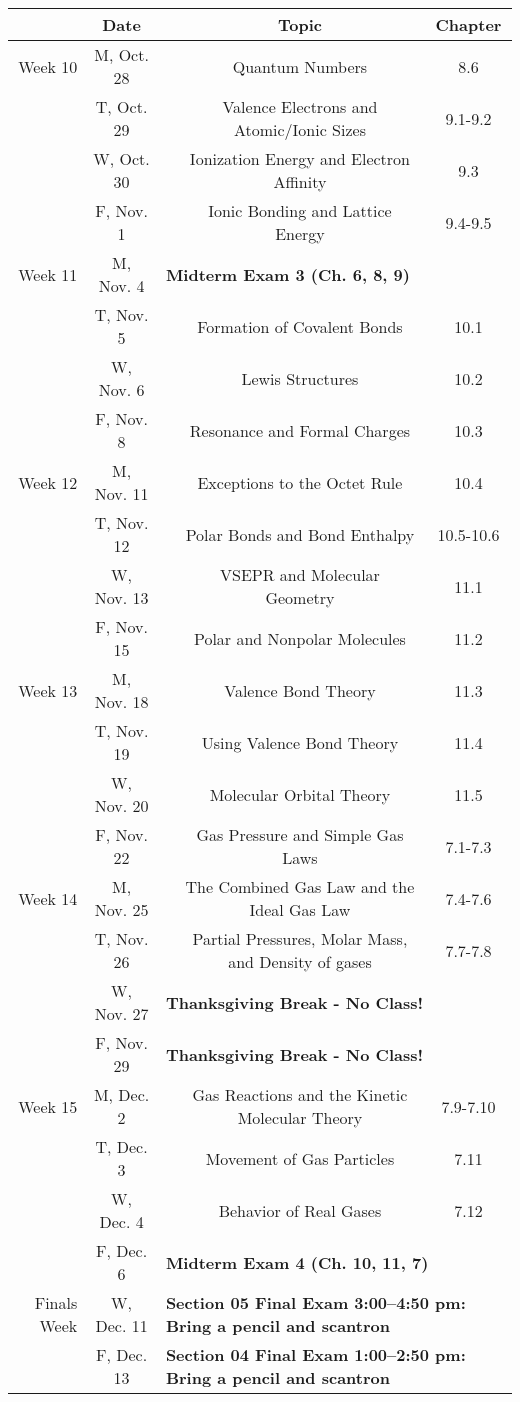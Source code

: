 \documentclass[12pt, letterpaper]{article}
\begin{document}
\noindent\hspace{-1.5em}
\begin{tabular}{rcccc}
	& Date && Topic & Chapter\\
	\midrule
	Week 10 & M, Oct. 28&& Quantum Numbers & 8.6\\
	& T, Oct. 29&& Valence Electrons and Atomic/Ionic Sizes & 9.1-9.2\\
	& W, Oct. 30&& Ionization Energy and Electron Affinity & 9.3\\
	& F, Nov. 1&& Ionic Bonding and Lattice Energy & 9.4-9.5\\
	\midrule
	Week 11 & M, Nov. 4& \multicolumn{3}{l}{\textbf{Midterm Exam 3 (Ch. 6, 8, 9)}}\\
	& T, Nov. 5&& Formation of Covalent Bonds & 10.1\\
	& W, Nov. 6&& Lewis Structures & 10.2\\
	& F, Nov. 8&& Resonance and Formal Charges & 10.3\\
	\midrule
	Week 12 & M, Nov. 11&& Exceptions to the Octet Rule & 10.4\\
	& T, Nov. 12&& Polar Bonds and Bond Enthalpy & 10.5-10.6\\
	& W, Nov. 13&& VSEPR and Molecular Geometry & 11.1\\
	& F, Nov. 15&& Polar and Nonpolar Molecules & 11.2\\
	\midrule
	Week 13 & M, Nov. 18&& Valence Bond Theory & 11.3\\
	& T, Nov. 19&& Using Valence Bond Theory & 11.4\\
	& W, Nov. 20&& Molecular Orbital Theory & 11.5\\
	& F, Nov. 22&& Gas Pressure and Simple Gas Laws & 7.1-7.3\\
	\midrule
	Week 14 & M, Nov. 25&& The Combined Gas Law and the Ideal Gas Law & 7.4-7.6\\
	& T, Nov. 26&& Partial Pressures, Molar Mass, and Density of gases & 7.7-7.8\\
	& W, Nov. 27& \multicolumn{3}{l}{\textbf{Thanksgiving Break - No Class!}}\\
	& F, Nov. 29& \multicolumn{3}{l}{\textbf{Thanksgiving Break - No Class!}}\\
	\midrule
	Week 15 & M, Dec. 2&& Gas Reactions and the Kinetic Molecular Theory & 7.9-7.10\\
	& T, Dec. 3&& Movement of Gas Particles & 7.11\\
	& W, Dec. 4&& Behavior of Real Gases & 7.12\\
	& F, Dec. 6& \multicolumn{3}{l}{\textbf{Midterm Exam 4 (Ch. 10, 11, 7)}}\\
	\midrule
	\midrule
	Finals Week & W, Dec. 11& \multicolumn{3}{l}{\textbf{Section 05 Final Exam 3:00--4:50 pm: Bring a pencil and scantron}}\\
	& F, Dec. 13& \multicolumn{3}{l}{\textbf{Section 04 Final Exam 1:00--2:50 pm: Bring a pencil and scantron}}\\
\end{tabular}
\end{document}
